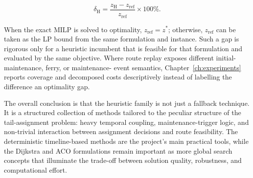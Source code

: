 \begin{equation}
    \delta_{\mathrm{H}} = \frac{z_{\mathrm{H}} - z_{\mathrm{ref}}}{z_{\mathrm{ref}}} \times 100\%. 
\end{equation}

When the exact MILP is solved to optimality, $z_{\mathrm{ref}} = z^{*}$;
otherwise, $z_{\mathrm{ref}}$ can be taken as the LP bound from the same
formulation and instance. Such a gap is rigorous only for a heuristic incumbent
that is feasible for that formulation and evaluated by the same objective.
Where route replay exposes different initial-maintenance, ferry, or maintenance-
event semantics, Chapter~\ref{ch:experiments} reports coverage and decomposed
costs descriptively instead of labelling the difference an optimality gap.

The overall conclusion is that the heuristic family is not just a fallback technique. It is a structured collection of methods tailored to the peculiar structure of the tail-assignment problem: heavy temporal coupling, maintenance-trigger logic, and non-trivial interaction between assignment decisions and route feasibility. The deterministic timeline-based methods are the project’s main practical tools, while the Dijkstra and ACO formulations remain important as more global search concepts that illuminate the trade-off between solution quality, robustness, and computational effort.
